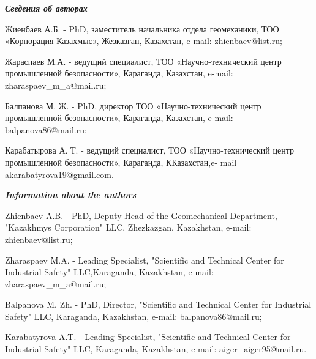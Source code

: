 \begin{info}
\hspace{1em}\emph{{\bfseries Сведения об авторах}}

Жиенбаев А.Б. - PhD, заместитель начальника отдела геомеханики, ТОО
«Корпорация Казахмыс», Жезказган, Казахстан, e-mail:
zhienbaev@list.ru;

Жараспаев М.А. - ведущий специалист, ТОО «Научно-технический центр
промышленной безопасности», Караганда, Казахстан, e-mail:
zharaspaev\_m\_a@mail.ru;

Балпанова М. Ж. - PhD, директор ТОО «Научно-технический центр
промышленной безопасности», Караганда, Казахстан, e-mail:
balpanova86@mail.ru;

Карабатырова А. Т. - ведущий специалист, ТОО «Научно-технический центр
промышленной безопасности», Караганда, ККазахстан,e- mail
akarabatyrova19@gmail.com.

\hspace{1em}\emph{{\bfseries Information about the authors}}

Zhienbaev A.B. - PhD, Deputy Head of the Geomechanical Department,
"Kazakhmys Corporation" LLC, Zhezkazgan, Kazakhstan, e-mail:
zhienbaev@list.ru;

Zharaspaev M.A. - Leading Specialist, "Scientific and Technical Center
for Industrial Safety" LLC,Karaganda, Kazakhstan, e-mail:
zharaspaev\_m\_a@mail.ru;

Balpanova M. Zh. - PhD, Director, "Scientific and Technical Center for
Industrial Safety" LLC, Karaganda, Kazakhstan, e-mail:
balpanova86@mail.ru;

Karabatyrova A.T. - Leading Specialist, "Scientific and Technical Center
for Industrial Safety" LLC, Karaganda, Kazakhstan, e-mail:
aiger\_aiger95@mail.ru.
\end{info}
